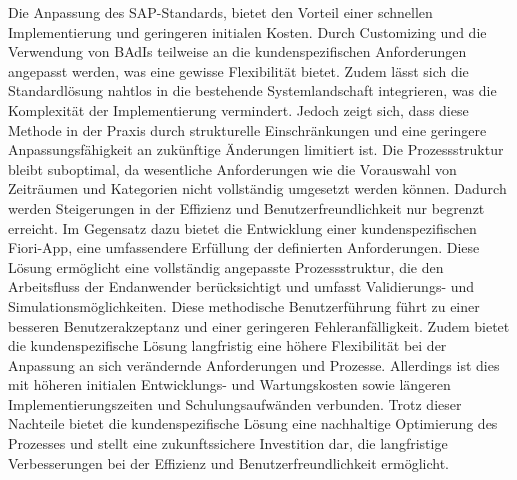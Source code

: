 
Die Anpassung des SAP-Standards, bietet den Vorteil einer schnellen Implementierung und geringeren initialen Kosten. Durch Customizing und  die Verwendung von BAdIs teilweise an die kundenspezifischen Anforderungen angepasst werden, was eine gewisse Flexibilität bietet. Zudem lässt sich die Standardlösung nahtlos in die bestehende Systemlandschaft integrieren, was die Komplexität der Implementierung vermindert. Jedoch zeigt sich, dass diese Methode in der Praxis durch strukturelle Einschränkungen und eine geringere Anpassungsfähigkeit an zukünftige Änderungen limitiert ist. Die Prozessstruktur bleibt suboptimal, da wesentliche Anforderungen wie die Vorauswahl von Zeiträumen und Kategorien nicht vollständig umgesetzt werden können. Dadurch werden Steigerungen in der Effizienz und Benutzerfreundlichkeit nur begrenzt erreicht. Im Gegensatz dazu bietet die Entwicklung einer kundenspezifischen Fiori-App, eine umfassendere Erfüllung der definierten Anforderungen. Diese Lösung ermöglicht eine vollständig angepasste Prozessstruktur, die den Arbeitsfluss der Endanwender berücksichtigt und umfasst Validierungs- und Simulationsmöglichkeiten. Diese methodische Benutzerführung führt zu einer besseren Benutzerakzeptanz und einer geringeren Fehleranfälligkeit. Zudem bietet die kundenspezifische Lösung langfristig eine höhere Flexibilität bei der Anpassung an sich verändernde Anforderungen und Prozesse. Allerdings ist dies mit höheren initialen Entwicklungs- und Wartungskosten sowie längeren Implementierungszeiten und Schulungsaufwänden verbunden. Trotz dieser Nachteile bietet die kundenspezifische Lösung eine nachhaltige Optimierung des Prozesses und stellt eine zukunftssichere Investition dar, die langfristige Verbesserungen bei der Effizienz und Benutzerfreundlichkeit ermöglicht.

